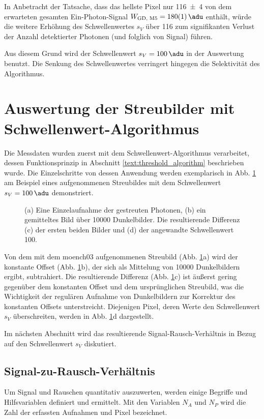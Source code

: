 \noindent
In Anbetracht der Tatsache, dass das hellste Pixel nur \SI{116(4)}{\adu} von dem erwarteten gesamten Ein-Photon-Signal $W_\text{GD, M5} = \SI{180(1)}{\adu}$ enthält, würde die weitere Erhöhung des Schwellenwertes $s_V$ über \SI{116}{\adu} zum signifikanten Verlust der Anzahl detektierter Photonen (und folglich von Signal) führen.

\noindent
Aus diesem Grund wird der Schwellenwert $s_V = \SI{100}{\adu}$ in der Auswertung benutzt. Die Senkung des Schwellenwertes verringert hingegen die Selektivität des Algorithmus.

\section{Auswertung der Streubilder mit Schwellenwert-Algorithmus}
\label{text:streuung_counting}
Die Messdaten wurden zuerst mit dem Schwellenwert-Algorithmus verarbeitet, dessen Funktionsprinzip in Abschnitt \ref{text:threshold_algorithm} beschrieben wurde. Die Einzelschritte von dessen Anwendung werden exemplarisch in Abb. \ref{fig:capture_ped_diff} am Beispiel eines aufgenommenen Streubildes mit dem Schwellenwert $s_V = \SI{100}{\adu}$ demonstriert.
\begin{figure}[H]
    \centering
    
    \caption{(a) Eine Einzelaufnahme der gestreuten Photonen, (b) ein gemitteltes Bild über \num{10000} Dunkelbilder.  Die resultierende Differenz (c) der ersten beiden Bilder und (d) der angewandte Schwellenwert \SI{100}{\adu}.}
    \label{fig:capture_ped_diff}
\end{figure}
\noindent
Von dem mit dem \gls{moench03} aufgenommenen Streubild (Abb. \ref{fig:capture_ped_diff}a) wird der konstante Offset (Abb. \ref{fig:capture_ped_diff}b), der sich als Mittelung von \num{10000} Dunkelbildern ergibt, subtrahiert. Die resultierende Differenz (Abb. \ref{fig:capture_ped_diff}c) ist äußerst gering gegenüber dem konstanten Offset und dem ursprünglichen Streubild, was die Wichtigkeit der regulären Aufnahme von Dunkelbildern zur Korrektur des konstanten Offsets unterstreicht. Diejenigen Pixel, deren Werte den Schwellenwert $s_V$ überschreiten, werden in Abb. \ref{fig:capture_ped_diff}d dargestellt.

\noindent
Im nächsten Abschnitt wird das resultierende Signal-Rausch-Verhältnis in Bezug auf den Schwellenwert $s_V$ diskutiert.

\subsection{Signal-zu-Rausch-Verhältnis}
Um Signal und Rauschen quantitativ auszuwerten, werden einige Begriffe und Hilfsvariablen definiert und ermittelt. Mit den Variablen $N_A$ und $N_P$ wird die Zahl der erfassten Aufnahmen und Pixel bezeichnet.

